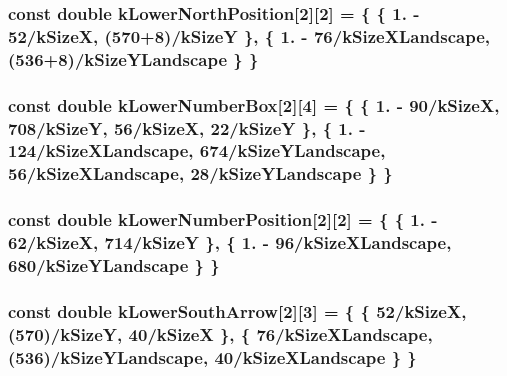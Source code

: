 \hypertarget{a00222_a813fd9e949135304a25f6023a1b09304}{
\subsubsection[{k\-Lower\-North\-Position}]{\setlength{\rightskip}{0pt plus 5cm}const double k\-Lower\-North\-Position\mbox{[}2\mbox{]}\mbox{[}2\mbox{]} = \{ \{ 1. -\/ 52/{\bf k\-Size\-X}, (570+8)/{\bf k\-Size\-Y} \}, \{ 1. -\/ 76/{\bf k\-Size\-X\-Landscape}, (536+8)/{\bf k\-Size\-Y\-Landscape} \} \}\hspace{0.3cm}{\ttfamily [static]}}}\label{a00222_a813fd9e949135304a25f6023a1b09304}
\hypertarget{a00222_a86581dcc2cf8e10c2913c36f43adbc56}{
\subsubsection[{k\-Lower\-Number\-Box}]{\setlength{\rightskip}{0pt plus 5cm}const double k\-Lower\-Number\-Box\mbox{[}2\mbox{]}\mbox{[}4\mbox{]} = \{ \{ 1. -\/ 90/{\bf k\-Size\-X}, 708/{\bf k\-Size\-Y}, 56/{\bf k\-Size\-X}, 22/{\bf k\-Size\-Y} \}, \{ 1. -\/ 124/{\bf k\-Size\-X\-Landscape}, 674/{\bf k\-Size\-Y\-Landscape}, 56/{\bf k\-Size\-X\-Landscape}, 28/{\bf k\-Size\-Y\-Landscape} \} \}\hspace{0.3cm}{\ttfamily [static]}}}\label{a00222_a86581dcc2cf8e10c2913c36f43adbc56}
\hypertarget{a00222_a85b639c5e342d65b45d37592e7ca9d9f}{
\subsubsection[{k\-Lower\-Number\-Position}]{\setlength{\rightskip}{0pt plus 5cm}const double k\-Lower\-Number\-Position\mbox{[}2\mbox{]}\mbox{[}2\mbox{]} = \{ \{ 1. -\/ 62/{\bf k\-Size\-X}, 714/{\bf k\-Size\-Y} \}, \{ 1. -\/ 96/{\bf k\-Size\-X\-Landscape}, 680/{\bf k\-Size\-Y\-Landscape} \} \}\hspace{0.3cm}{\ttfamily [static]}}}\label{a00222_a85b639c5e342d65b45d37592e7ca9d9f}
\hypertarget{a00222_a422516853c2c729aa780a643e785b7f6}{
\subsubsection[{k\-Lower\-South\-Arrow}]{\setlength{\rightskip}{0pt plus 5cm}const double k\-Lower\-South\-Arrow\mbox{[}2\mbox{]}\mbox{[}3\mbox{]} = \{ \{ 52/{\bf k\-Size\-X}, (570)/{\bf k\-Size\-Y}, 40/{\bf k\-Size\-X} \}, \{ 76/{\bf k\-Size\-X\-Landscape}, (536)/{\bf k\-Size\-Y\-Landscape}, 40/{\bf k\-Size\-X\-Landscape} \} \}\hspace{0.3cm}{\ttfamily [static]}}}\label{a00222_a422516853c2c729aa780a643e785b7f6}
